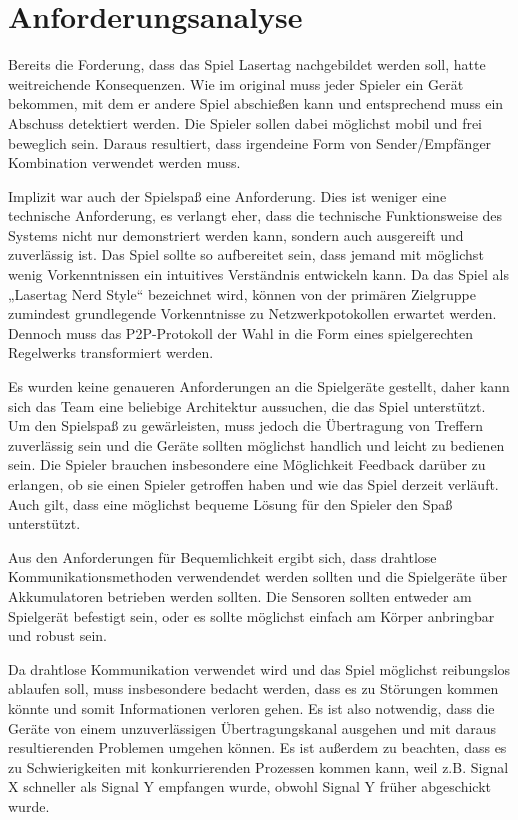 \section{Anforderungsanalyse}

Bereits die Forderung, dass das Spiel Lasertag nachgebildet werden soll, hatte weitreichende
Konsequenzen.
Wie im original muss jeder Spieler ein Gerät bekommen, mit dem er andere Spiel abschießen kann und
entsprechend muss ein Abschuss detektiert werden.
Die Spieler sollen dabei möglichst mobil und frei beweglich sein.
Daraus resultiert, dass irgendeine Form von Sender/Empfänger Kombination verwendet werden muss.

Implizit war auch der Spielspaß eine Anforderung.
Dies ist weniger eine technische Anforderung, es verlangt eher, dass die technische Funktionsweise
des Systems nicht nur demonstriert werden kann, sondern auch ausgereift und zuverlässig ist.
Das Spiel sollte so aufbereitet sein, dass jemand mit möglichst wenig Vorkenntnissen ein intuitives
Verständnis entwickeln kann.
Da das Spiel als „Lasertag Nerd Style“ bezeichnet wird, können von der primären Zielgruppe zumindest
grundlegende Vorkenntnisse zu Netzwerkpotokollen erwartet werden. Dennoch muss das P2P-Protokoll der
Wahl in die Form eines spielgerechten Regelwerks transformiert werden.

Es wurden keine genaueren Anforderungen an die Spielgeräte gestellt, daher kann sich das Team eine
beliebige Architektur aussuchen, die das Spiel unterstützt.
Um den Spielspaß zu gewärleisten, muss jedoch die Übertragung von Treffern zuverlässig sein und die
Geräte sollten möglichst handlich und leicht zu bedienen sein.
Die Spieler brauchen insbesondere eine Möglichkeit Feedback darüber zu erlangen, ob sie einen
Spieler getroffen haben und wie das Spiel derzeit verläuft. Auch gilt, dass eine möglichst bequeme
Lösung für den Spieler den Spaß unterstützt.

Aus den Anforderungen für Bequemlichkeit ergibt sich, dass drahtlose Kommunikationsmethoden
verwendendet werden sollten und die Spielgeräte über Akkumulatoren betrieben werden sollten.
Die Sensoren sollten entweder am Spielgerät befestigt sein, oder es sollte möglichst einfach am
Körper anbringbar und robust sein.

Da drahtlose Kommunikation verwendet wird und das Spiel möglichst reibungslos ablaufen soll, muss
insbesondere bedacht werden, dass es zu Störungen kommen könnte und somit Informationen verloren
gehen.
Es ist also notwendig, dass die Geräte von einem unzuverlässigen Übertragungskanal ausgehen und mit
daraus resultierenden Problemen umgehen können.
Es ist außerdem zu beachten, dass es zu Schwierigkeiten mit konkurrierenden Prozessen kommen kann,
weil z.B. Signal X schneller als Signal Y empfangen wurde, obwohl Signal Y früher abgeschickt wurde.
